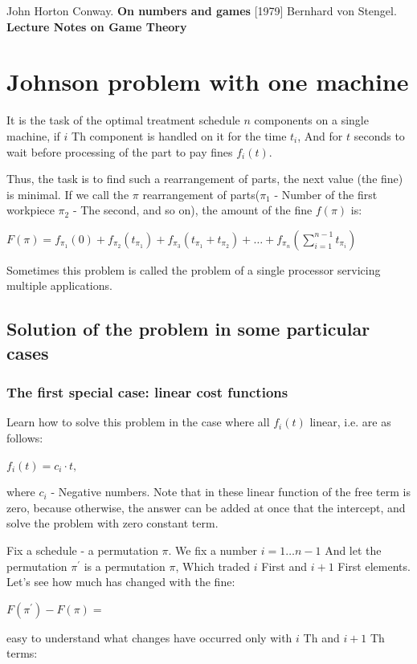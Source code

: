 John Horton Conway. \textbf{On numbers and games} [1979]
Bernhard von Stengel. \textbf{Lecture Notes on Game Theory}

\section{ Johnson problem with one machine }
It is the task of the optimal treatment schedule $n$ components on a single machine, if $i$ Th component is handled on it for the time $t_i$, And for $t$ seconds to wait before processing of the part to pay fines $f_i (t)$.

Thus, the task is to find such a rearrangement of parts, the next value (the fine) is minimal. If we call the $\pi$ rearrangement of parts($\pi_1$ - Number of the first workpiece $\pi_2$ - The second, and so on), the amount of the fine $f (\pi)$ is:

$F(\pi)=f_{\pi_{1}}(0)+f_{\pi_{2}}(t_{\pi_{1}})+f_{\pi_{3}}(t_{\pi_{1}}+t_{\pi_{2}})+\ldots+f_{\pi_{n}}\left(\sum_{i=1}^{n-1}t_{\pi_{i}}\right)$

Sometimes this problem is called the problem of a single processor servicing multiple applications.

\subsection{ Solution of the problem in some particular cases }

\subsubsection{ The first special case: linear cost functions }

Learn how to solve this problem in the case where all $f_i (t)$ linear, i.e. are as follows:

$f_i (t) = c_i \cdot t,$

where $c_i$ - Negative numbers. Note that in these linear function of the free term is zero, because otherwise, the answer can be added at once that the intercept, and solve the problem with zero constant term.

Fix a schedule - a permutation $\pi$. We fix a number $i = 1 \ldots n-1$ And let the permutation $\pi ^ \prime$ is a permutation $\pi$, Which traded $i$ First and $i +1$ First elements. Let's see how much has changed with the fine:

$F (\pi ^ \prime) - F (\pi) =$

easy to understand what changes have occurred only with $i$ Th and $i +1$ Th terms:


